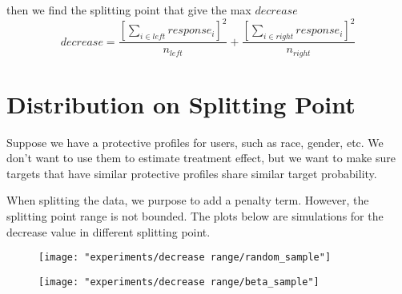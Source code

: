 \documentclass[12pt,letterpaper]{article}
\begin{document}
then we find the splitting point that give the max $ decrease $
\begin{equation}\label{key}
	decrease = \dfrac{[\sum\limits_{i \in left} response_{i}]^2}{n_{left}} +  \dfrac{[\sum\limits_{i \in right} response_{i}]^2}{n_{right}}
\end{equation}


\section{Distribution on Splitting Point}
Suppose we have a protective profiles for users, such as race, gender, etc. We don't want to use them to estimate treatment effect, but we want to make sure targets that have similar protective profiles share similar target probability. 


When splitting the data, we purpose to add a penalty term. However,  the splitting point range is not bounded. The plots below are simulations for the decrease value in different splitting point.  


\begin{figure}[H]
	\centering
	\label{fig:betasample}
	\texttt{[image: "experiments/decrease range/random\_sample"]}
\end{figure}


\begin{figure}[H]
	\centering
	\label{fig:betasample}
	\texttt{[image: "experiments/decrease range/beta\_sample"]}
\end{figure}
\end{document}
